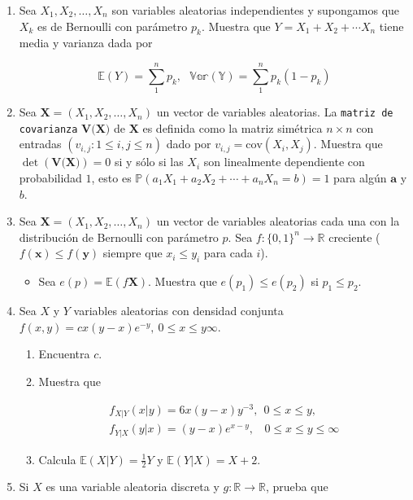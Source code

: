\documentclass[a4paper,11pt]{report}
\begin{document}
\begin{enumerate}
\item Sea $X_1, X_2, \dots, X_n$ son variables aleatorias independientes y supongamos que $X_k$ es de Bernoulli con par\'ametro $p_k$. Muestra que $Y = X_1 +X_2 + \cdots X_n$ tiene media y varianza dada por

 \[
 \mathbb{E}(Y) = \sum_{1}^{n}p_k, \ \ \ \mathbb{Var(Y)} = \sum_{1}^{n}p_k(1 - p_k)
 \]
\item Sea $\textbf{X} = (X_1, X_2, \dots, X_n)$ un vector de variables aleatorias. La \texttt{matriz de covarianza} $\textbf{V(X)}$ de $\textbf{X}$ es definida como la matriz sim\'etrica $n \times n$ con entradas $(v_{i,j}: 1\leq i, j\leq n)$ dado por $v_{i,j} = \text{cov}(X_i, X_j)$. Muestra que $\det(\textbf{V(X)}) = 0$ si y s\'olo si las $X_i$ son linealmente dependiente con probabilidad $1$, esto es $\mathbb{P}(a_1X_1 + a_2X_2 + \cdots +a_nX_n = b) =1$ para alg\'un $\textbf{a}$ y $b$.
\item Sea $\textbf{X} = (X_1, X_2, \dots, X_n)$ un vector de variables aleatorias cada una con la distribuci\'on de Bernoulli con par\'ametro $p$. Sea $f:\{0, 1\}^n \rightarrow \mathbb{R}$ creciente ($f(\mathbf{x}) \leq f(\mathbf{y})$ siempre que $x_i \leq y_i$ para cada $i$). 

\begin{itemize}
	\item Sea $e(p) = \mathbb{E}(f\textbf{X})$. Muestra que $e(p_1) \leq e(p_2)$ si $p_1 \leq p_2$.
\end{itemize}

\item Sea $X$ y $Y$ variables aleatorias con densidad conjunta $f(x,y) =cx(y -x)e^{-y}, \ 0 \leq x \leq y \infty$.

\begin{enumerate}
	\item Encuentra $c$.
	\item Muestra que
	
	\begin{align*}
	f_{X|Y}(x | y) = 6x(y -x)y^{-3}, \ \ 0 \leq x \leq y, \\
	f_{Y|X}(y|x) = (y -x)e^{x -y}, \ \ \ \ 0 \leq x \leq y \leq \infty
	\end{align*}
\item Calcula $\mathbb{E}(X|Y) =\frac{1}{2}Y$ y  $\mathbb{E}(Y|X) = X +2$.
\end{enumerate}
\item Si $X$ es una variable aleatoria discreta y $g: \mathbb{R} \rightarrow \mathbb{R}$, prueba que 


\end{enumerate}
\end{document}
